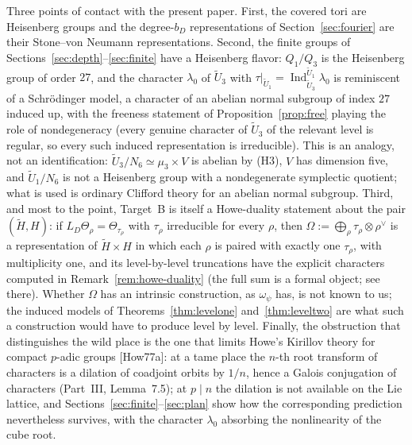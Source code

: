 \documentclass[11pt]{article}
\newcommand{\Ind}{\operatorname{Ind}}
\newcommand{\tH}{\widetilde H}
\newcommand{\tU}{\widetilde U}
\theoremstyle{plain}
\theoremstyle{definition}
\begin{document}
Three points of contact with the present paper.  First, the covered
tori are Heisenberg groups and the degree-$b_D$ representations of
Section~\ref{sec:fourier} are their Stone--von Neumann representations.
Second, the finite groups of Sections~\ref{sec:depth}--\ref{sec:finite}
have a Heisenberg flavor: $Q_1/Q_3$ is the Heisenberg group of order
$27$, and the character $\lambda_0$ of $\tU_3$ with
$\tau|_{\tU_1}=\Ind_{\tU_3}^{\tU_1}\lambda_0$ is reminiscent of a
Schr\"odinger model, a character of an abelian normal subgroup of index
$27$ induced up, with the freeness statement of
Proposition~\ref{prop:free} playing the role of nondegeneracy (every
genuine character of $\tU_3$ of the relevant level is regular, so every
such induced representation is irreducible).  This is an analogy, not an
identification: $\tU_3/N_6\simeq\mu_3\times V$ is abelian by (H3), $V$
has dimension five, and $\tU_1/N_6$ is not a Heisenberg group with a
nondegenerate symplectic quotient; what is used is ordinary Clifford
theory for an abelian normal subgroup.  Third, and most
to the point, Target~B is itself a Howe-duality statement about the pair
$(\tH,H)$: if $L_D\Theta_\rho=\Theta_{\tau_\rho}$ with $\tau_\rho$
irreducible for every $\rho$, then $\Omega:=\bigoplus_\rho\tau_\rho\otimes\rho^\vee$
is a representation of $\tH\times H$ in which each $\rho$ is paired
with exactly one $\tau_\rho$, with multiplicity one, and its
level-by-level truncations have the explicit characters computed in
Remark~\ref{rem:howe-duality} (the full sum is a formal object; see
there).
Whether $\Omega$ has an intrinsic construction, as $\omega_\psi$ has,
is not known to us; the induced models of
Theorems~\ref{thm:levelone} and~\ref{thm:leveltwo} are what such a
construction would have to produce level by level.  Finally, the
obstruction that distinguishes the wild place is the one that limits
Howe's Kirillov theory for compact $p$-adic groups [How77a]: at a tame
place the $n$-th root transform of characters is a dilation of coadjoint
orbits by $1/n$, hence a Galois conjugation of characters (Part~III,
Lemma~7.5); at $p\mid n$ the dilation is not available on the Lie
lattice, and Sections~\ref{sec:finite}--\ref{sec:plan} show how the
corresponding prediction nevertheless survives, with the character
$\lambda_0$ absorbing the nonlinearity of the cube root.
\end{document}

